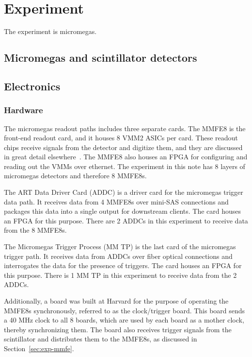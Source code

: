 \section{Experiment}
\label{sec:exp}

The experiment is micromegas.

\subsection{Micromegas and scintillator detectors}
\label{sec:exp-mm}

\subsection{Electronics}
\label{sec:exp-elx}

\subsubsection{Hardware}
\label{sec:exp-hw}

The micromegas readout paths includes three separate cards. The MMFE8 is the front-end readout card, and it houses 8 VMM2 ASICs per card. These readout chips receive signals from the detector and digitize them, and they are discussed in great detail elsewhere~\cite{nswtdr,noisy,noiseless}. The MMFE8 also houses an FPGA for configuring and reading out the VMMs over ethernet. The experiment in this note has 8 layers of micromegas detectors and therefore 8 MMFE8s.

The ART Data Driver Card (ADDC) is a driver card for the micromegas trigger data path. It receives data from 4 MMFE8s over mini-SAS connections and packages this data into a single output for downstream clients. The card houses an FPGA for this purpose. There are 2 ADDCs in this experiment to receive data from the 8 MMFE8s.

The Micromegas Trigger Process (MM TP) is the last card of the micromegas trigger path. It receives data from ADDCs over fiber optical connections and interrogates the data for the presence of triggers. The card houses an FPGA for this purpose. There is 1 MM TP in this experiment to receive data from the 2 ADDCs.

Additionally, a board was built at Harvard for the purpose of operating the MMFE8s synchronously, referred to as the clock/trigger board. This board sends a 40 MHz clock to all 8 boards, which are used by each board as a mother clock, thereby synchronizing them. The board also receives trigger signals from the scintillator and distributes them to the MMFE8s, as discussed in Section~\ref{sec:exp-mmfe}.

